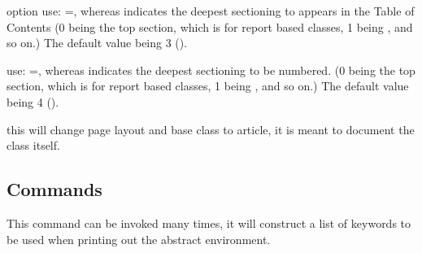 \documentclass[article,nogeometry,english,tocdepth=3,secdepth=3]{ufrgscca} %
\begin{document}
\begin{describelist}{option}
	 { use: =, whereas  indicates the deepest sectioning to appears in the Table of Contents (0 being the top section, which is \tsmacro{\chapter}{} for report based classes, 1 being \tsmacro{\section}{}, and so on.) The default value being 3 (\tsmacro{\subsubsection}{}).}

	 { use: =, whereas  indicates the deepest sectioning to be numbered. (0 being the top section, which is \tsmacro{\chapter}{} for report based classes, 1 being \tsmacro{\section}{}, and so on.) The default value being 4 (\tsmacro{\paragraph}{}).}

	 {  this will change page layout and base class to article, it is meant to document the class itself.}
\end{describelist}


\subsection{Commands}

\begin{codedescribe}{\keyword}
	\begin{codesyntax}%
	\end{codesyntax}
  This command can be invoked many times, it will construct a list of keywords to be used when printing out the abstract environment.
\end{codedescribe}
\end{document}
